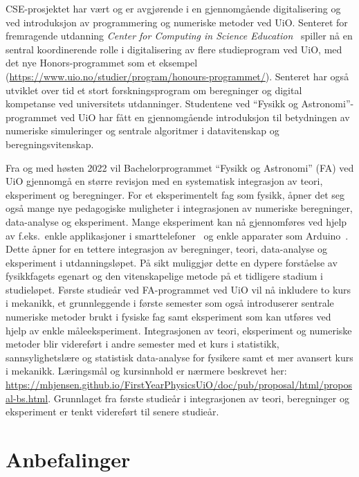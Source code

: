 \documentclass{article}
\begin{document}
CSE-prosjektet har vært og er avgjørende i en gjennomgående digitalisering og ved introduksjon av programmering og numeriske metoder ved UiO. Senteret for fremragende utdanning \emph{Center for Computing in Science Education}~\cite{UiOCCSE} spiller nå en sentral koordinerende rolle i digitalisering av flere studieprogram ved UiO, med det nye Honors-programmet som et eksempel (\url{https://www.uio.no/studier/program/honours-programmet/}). Senteret har også utviklet over tid et stort forskningsprogram om beregninger og digital kompetanse ved universitets utdanninger. Studentene ved ``Fysikk og Astronomi''-programmet ved UiO har fått en gjennomgående introduksjon til betydningen av numeriske simuleringer og sentrale algoritmer i datavitenskap og beregningsvitenskap.

Fra og med høsten 2022 vil Bachelorprogrammet ``Fysikk og Astronomi'' (FA) ved UiO gjennomgå en større revisjon med en systematisk integrasjon av teori, eksperiment og beregninger.
For et eksperimentelt fag som fysikk, åpner det seg også mange nye pedagogiske muligheter i integrasjonen av numeriske beregninger, data-analyse og eksperiment. Mange eksperiment kan nå gjennomføres ved hjelp av f.eks.~enkle applikasjoner i smarttelefoner~\cite{phyphox} og enkle apparater som Arduino~\cite{arduino}. Dette åpner for en tettere integrasjon av beregninger, teori, data-analyse og eksperiment i utdanningsløpet. På sikt muliggjør dette en dypere forståelse av fysikkfagets egenart og den vitenskapelige metode på et tidligere stadium i studieløpet.  Første studieår ved FA-programmet ved UiO vil nå inkludere to kurs i mekanikk, et grunnleggende i første semester som også introduserer sentrale numeriske metoder brukt i fysiske fag samt eksperiment som kan utføres ved hjelp av enkle måleeksperiment. Integrasjonen av teori, eksperiment og numeriske metoder blir videreført i andre semester med et kurs i statistikk, sannsylighetslære og statistisk data-analyse for fysikere samt et mer avansert kurs i mekanikk.
Læringsmål og kursinnhold er nærmere beskrevet her: \url{https://mhjensen.github.io/FirstYearPhysicsUiO/doc/pub/proposal/html/proposal-bs.html}.
Grunnlaget fra første studieår i integrasjonen av teori, beregninger og eksperiment er tenkt videreført til senere studieår.

\section{Anbefalinger}
\label{sec:anbefalinger}


\end{document}
